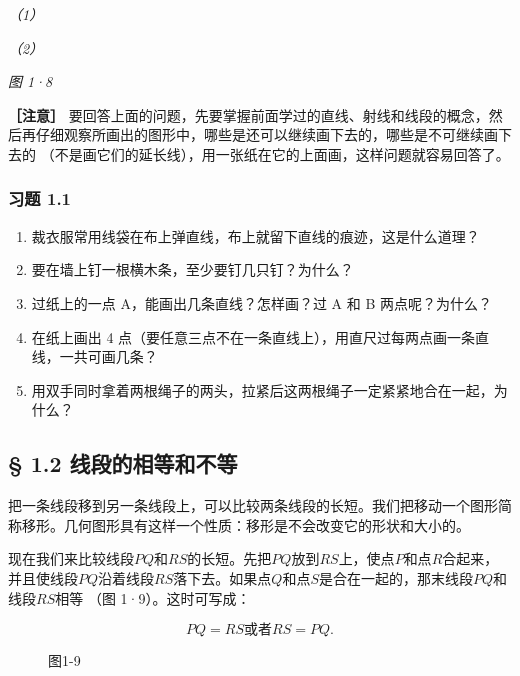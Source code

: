 \emph{（1）}

\emph{（2）}

\emph{图 1·8}

\textbf{［注意］}
要回答上面的问题，先要掌握前面学过的直线、射线和线段的概念，然后再仔细观察所画出的图形中，哪些是还可以继续画下去的，哪些是不可继续画下去的
（不是画它们的延长线），用一张纸在它的上面画，这样问题就容易回答了。

\subsubsection{习题 1.1}

\begin{enumerate}
\item
  裁衣服常用线袋在布上弹直线，布上就留下直线的痕迹，这是什么道理？
\item
  要在墙上钉一根横木条，至少要钉几只钉？为什么？
\item
  过纸上的一点 A，能画出几条直线？怎样画？过 A 和 B 两点呢？为什么？
\item
  在纸上画出 4
  点（要任意三点不在一条直线上），用直尺过每两点画一条直线，一共可画几条？
\item
  用双手同时拿着两根绳子的两头，拉紧后这两根绳子一定紧紧地合在一起，为什么？
\end{enumerate}

\subsection{§ 1.2
线段的相等和不等}

把一条线段移到另一条线段上，可以比较两条线段的长短。我们把移动一个图形简称移形。几何图形具有这样一个性质：移形是不会改变它的形状和大小的。

现在我们来比较线段\(PQ\)和\(RS\)的长短。先把\(PQ\)放到\(RS\)上，使点\(P\)和点\(R\)合起来，并且使线段\(PQ\)沿着线段\(RS\)落下去。如果点\(Q\)和点\(S\)是合在一起的，那末线段\(PQ\)和线段\(RS\)相等
（图 1·9）。这时可写成：

\[
PQ = RS \text{或者} RS = PQ.
\]

\begin{figure}
\centering
{}
\caption{图1-9}
\end{figure}

